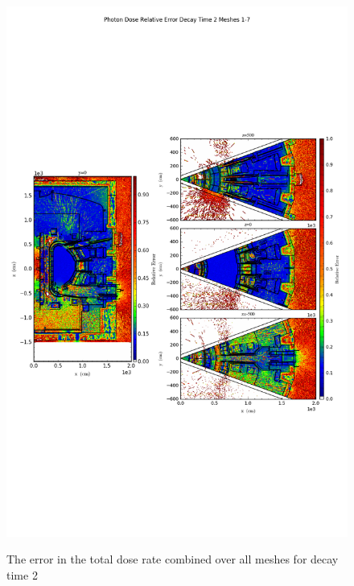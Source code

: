 \documentclass[12pt]{article}
\begin{document}
\begin{figure}[ht!]
\centering
\includegraphics[trim={0cm 9cm 0cm 10cm},clip,scale=0.75]{../plots/final_model_nob4c/Photon_Dose_Relative_Error_Decay_Time_2_Meshes_1-7.png}
\label{fig:photons_dc2_no4bc_total_error}
\caption{The error in the total dose rate combined over all meshes for decay time 2}
\end{figure}
\end{document}
